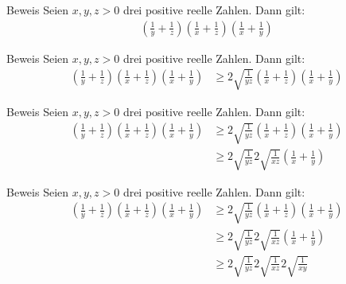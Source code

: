 \documentclass[10pt]{beamer}
\begin{document}
\begin{frame}{Beweis}
    Seien \(x, y, z > 0\) drei positive reelle Zahlen. Dann gilt:
    \begin{align*}
        \left( \frac{1}{y} + \frac{1}{z} \right) \left( \frac{1}{x} + \frac{1}{z} \right) \left( \frac{1}{x} + \frac{1}{y} \right)
    \end{align*}
\end{frame}



\begin{frame}{Beweis}
    Seien \(x, y, z > 0\) drei positive reelle Zahlen. Dann gilt:
    \begin{align*}
        \left( \frac{1}{y} + \frac{1}{z} \right) \left( \frac{1}{x} + \frac{1}{z} \right) \left( \frac{1}{x} + \frac{1}{y} \right)
        & \geq 2\sqrt{\frac{1}{yz}} \left( \frac{1}{x} + \frac{1}{z} \right) \left( \frac{1}{x} + \frac{1}{y} \right)
    \end{align*}
\end{frame}



\begin{frame}{Beweis}
    Seien \(x, y, z > 0\) drei positive reelle Zahlen. Dann gilt:
    \begin{align*}
        \left( \frac{1}{y} + \frac{1}{z} \right) \left( \frac{1}{x} + \frac{1}{z} \right) \left( \frac{1}{x} + \frac{1}{y} \right)
        & \geq 2\sqrt{\frac{1}{yz}} \left( \frac{1}{x} + \frac{1}{z} \right) \left( \frac{1}{x} + \frac{1}{y} \right) \\
        & \geq 2\sqrt{\frac{1}{yz}} 2\sqrt{\frac{1}{xz}} \left( \frac{1}{x} + \frac{1}{y} \right)
    \end{align*}
\end{frame}



\begin{frame}{Beweis}
    Seien \(x, y, z > 0\) drei positive reelle Zahlen. Dann gilt:
    \begin{align*}
        \left( \frac{1}{y} + \frac{1}{z} \right) \left( \frac{1}{x} + \frac{1}{z} \right) \left( \frac{1}{x} + \frac{1}{y} \right)
        & \geq 2\sqrt{\frac{1}{yz}} \left( \frac{1}{x} + \frac{1}{z} \right) \left( \frac{1}{x} + \frac{1}{y} \right) \\
        & \geq 2\sqrt{\frac{1}{yz}} 2\sqrt{\frac{1}{xz}} \left( \frac{1}{x} + \frac{1}{y} \right) \\
        & \geq 2\sqrt{\frac{1}{yz}} 2\sqrt{\frac{1}{xz}} 2\sqrt{\frac{1}{xy}}
    \end{align*}
\end{frame}
\end{document}
